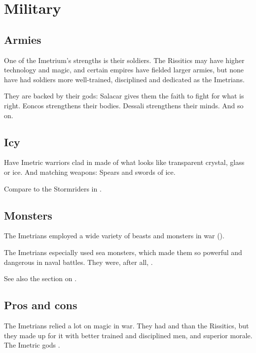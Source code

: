 \section{Military}





\subsection{Armies}
One of the Imetrium's strengths is their soldiers. 
The Rissitics may have higher technology and magic, and certain empires have fielded larger armies, but none have had soldiers more well-trained, disciplined and dedicated as the Imetrians. 

They are backed by their gods: 
Salacar gives them the faith to fight for what is right. 
Eoncos strengthens their bodies. 
Dessali strengthens their minds. 
And so on. 






\subsection{Icy \armour}
Have Imetric warriors clad in \armour made of what looks like transparent crystal, glass or ice. 
And matching weapons: 
Spears and swords of ice. 

Compare to the Stormriders in . 





\subsection{Monsters}
The Imetrians employed a wide variety of beasts and monsters in war ().

The Imetrians especially used sea monsters, which made them so powerful and dangerous in naval battles. 
They were, after all, . 

See also the section on . 





\subsection{Pros and cons}
The Imetrians relied a lot on magic in war. 
They had  and  than the Rissitics, but they made up for it with better trained and disciplined men, and superior morale.
The Imetric gods . 





